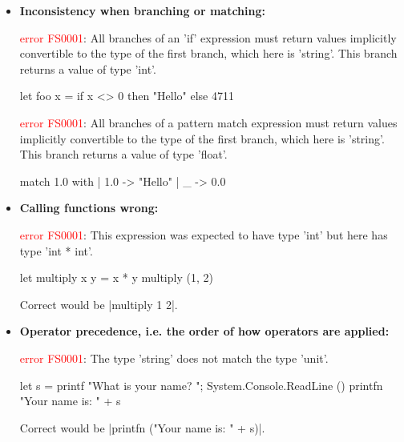 \begin{itemize}[nosep]
    \item \textbf{Inconsistency when branching or matching:}
        \begin{fsharpcodeshort}{}{\ttfamily\raggedright\footnotesize
            \textcolor{red}{error FS0001}: All branches of an 'if' expression must return values implicitly convertible to the type of the first branch, which here is 'string'. This branch returns a value of type 'int'.%
        }
        let foo x = if x <> 0 then "Hello" else 4711
        \end{fsharpcodeshort}
        \begin{fsharpcodeshort}{}{\ttfamily\raggedright\footnotesize
            \textcolor{red}{error FS0001}: All branches of a pattern match expression must return values implicitly convertible to the type of the first branch, which here is 'string'. This branch returns a value of type 'float'.%
        }
        match 1.0 with | 1.0 -> "Hello" | _ -> 0.0
        \end{fsharpcodeshort}
    \item \textbf{Calling functions wrong:}
        \begin{fsharpcodeshort}{}{\ttfamily\raggedright\footnotesize
            \textcolor{red}{error FS0001}: This expression was expected to have type 'int' but here has type 'int * int'.%
        }
        let multiply x y = x * y
        multiply (1, 2)
        \end{fsharpcodeshort}
        Correct would be \fsharp|multiply 1 2|.
    \item \textbf{Operator precedence, i.e. the order of how operators are applied:}
        \begin{fsharpcodeshort}{}{\ttfamily\raggedright\footnotesize
            \textcolor{red}{error FS0001}: The type 'string' does not match the type 'unit'.%
        }
        let s = printf "What is your name? "; System.Console.ReadLine ()
        printfn "Your name is: " + s
        \end{fsharpcodeshort}
        Correct would be \fsharp|printfn ("Your name is: " + s)|.
\end{itemize}
